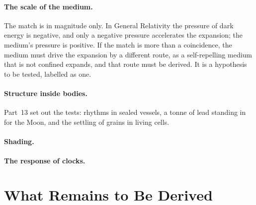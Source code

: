 \documentclass[11pt,a4paper]{article}
\begin{document}
\paragraph{The scale of the medium.}  The match is in magnitude only. In General Relativity the pressure of dark energy is negative, and only a negative pressure accelerates the expansion; the medium's pressure is positive. If the match is more than a coincidence, the medium must drive the expansion by a different route, as a self-repelling medium that is not confined expands, and that route must be derived. It is a hypothesis to be tested, labelled as one.

\paragraph{Structure inside bodies.}  Part~13 set out the tests: rhythms in sealed vessels, a tonne of lead standing in for the Moon, and the settling of grains in living cells.

\paragraph{Shading.} 

\paragraph{The response of clocks.} 

\section{What Remains to Be Derived}
\label{sec:remains}
\end{document}
